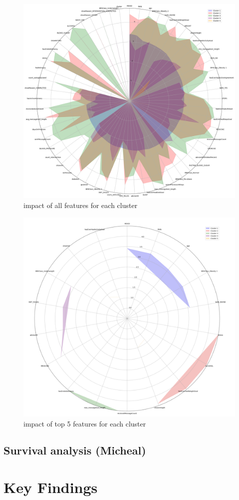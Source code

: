 \documentclass[12pt]{article}
\begin{document}
\begin{figure}[h]
  \centering
  \includegraphics[width=0.7\linewidth]{images/all_feature}
  \caption{impact of all features for each cluster}
  \label{fig:all_features}
  \end{figure}

  \begin{figure}[h]
    \centering
    \includegraphics[width=0.7\linewidth]{images/top5_features.png}
    \caption{impact of top 5 features for each cluster}
    \label{fig:top5_features}
    \end{figure}

\subsection{Survival analysis (Micheal)}

\section{Key Findings}
\end{document}
